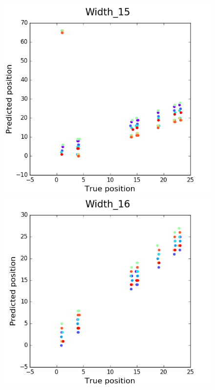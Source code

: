 \documentclass[11pt, oneside]{article}
\begin{document}
\begin{figure}[htbp]
\begin{minipage}{0.32\textwidth}
  \end{minipage}
  \hfill
  \begin{minipage}{0.32\textwidth}
    \centering
    \includegraphics[width=1\textwidth]{images/Width_15} %
  \end{minipage}
  \vfill
  \begin{minipage}{0.32\textwidth}
    \centering
    \includegraphics[width=\textwidth]{images/Width_16} %

\end{minipage}
\end{figure}
\end{document}

